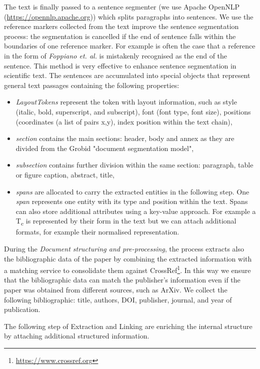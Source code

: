 \documentclass{article}
\begin{document}
The text is finally passed to a sentence segmenter (we use Apache OpenNLP (\url{https://opennlp.apache.org})) which splits paragraphs into sentences. We use the reference markers collected from the text improve the sentence segmentation process: the segmentation is cancelled if the end of sentence falls within the boundaries of one reference marker. For example is often the case that a reference in the form of \textit{Foppiano et. al.} is mistakenly recognised as the end of the sentence. This method is very effective to enhance sentence segmentation in scientific text. 
The sentences are accumulated into special objects that represent general text passages containing the following properties: 
\begin{itemize}
    \item \textit{LayoutTokens} represent the token with layout information, such as style (italic, bold, superscript, and subscript), font (font type, font size), positions (coordinates (a list of pairs x,y), index position within the text chain), 
    \item \textit{section} contains the main sections: header, body and annex as they are divided from the Grobid "document segmentation model", 
    \item \textit{subsection} contains further division within the same section: paragraph, table or figure caption, abstract, title, 
    \item \textit{spans} are allocated to carry the extracted entities in the following step. One \textit{span} represents one entity with its type and position within the text. Spans can also store additional attributes using a key-value approach. For example a T\textsubscript{c} is represented by their form in the text but we can attach additional formats, for example their normalised representation. 
\end{itemize}

During the \textit{Document structuring and pre-processing}, the process extracts also the bibliographic data of the paper by combining the extracted information with a matching service to consolidate them against CrossRef\footnote{\url{https://www.crossref.org}}. In this way we ensure that the bibliographic data can match the publisher's information even if the paper was obtained from different sources, such as ArXiv. We collect the following bibliographic: title, authors, DOI, publisher, journal, and year of publication.

The following step of Extraction and Linking are enriching the internal structure by attaching additional structured information. 
\end{document}
